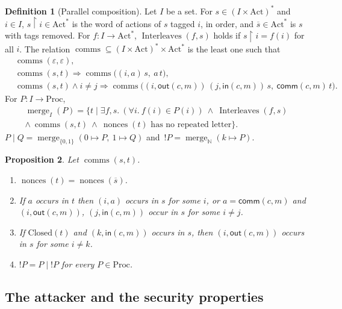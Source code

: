 \documentclass[11pt]{article}
\theoremstyle{definition}
\newtheorem{definition}{Definition}[section]
\theoremstyle{plain}
\newtheorem{proposition}[definition]{Proposition}
\theoremstyle{remark}
\newcommand{\N}{\mathbb{N}}
\newcommand{\Act}{\mathrm{Act}}
\newcommand{\Proc}{\mathrm{Proc}}
\newcommand{\Closed}{\mathrm{Closed}}
\newcommand{\nonces}{\operatorname{nonces}}
\newcommand{\comms}{\operatorname{comms}}
\newcommand{\mrg}{\operatorname{merge}}
\newcommand{\interleaves}{\operatorname{Interleaves}}
\begin{document}
\begin{definition}[Parallel composition]\label{def:par}
Let $I$ be a set. For $s\in(I\times\Act)^*$ and $i\in I$, $s{\restriction}i\in\Act^*$ is the word of actions of $s$ tagged $i$, in order, and $\overline{s}\in\Act^*$ is $s$ with tags removed. For $f:I\to\Act^*$, $\interleaves(f,s)$ holds if $s{\restriction}i=f(i)$ for all $i$. The relation $\comms\subseteq(I\times\Act)^*\times\Act^*$ is the least one such that
\begin{align*}
&\comms(\varepsilon,\varepsilon),\\
&\comms(s,t)\Rightarrow\comms\big((i,a)\,s,\ a\,t\big),\\
&\comms(s,t)\wedge i\ne j\Rightarrow\comms\big((i,\mathsf{out}(c,m))\,(j,\mathsf{in}(c,m))\,s,\ \mathsf{comm}(c,m)\,t\big).
\end{align*}
For $P:I\to\Proc$,
\begin{multline*}
\mrg_I(P)=\{t\mid \exists f,s.\ (\forall i.\ f(i)\in P(i))\ \wedge\ \interleaves(f,s)\\
\wedge\ \comms(s,t)\ \wedge\ \nonces(t)\text{ has no repeated letter}\}.
\end{multline*}
$P\mid Q=\mrg_{\{0,1\}}(0\mapsto P,\ 1\mapsto Q)$ and $\,!P=\mrg_{\N}(k\mapsto P)$.
\end{definition}

\begin{proposition}\label{prop:comms}
Let $\comms(s,t)$.
\begin{enumerate}
\item $\nonces(t)=\nonces(\overline{s})$.
\item If $a$ occurs in $t$ then $(i,a)$ occurs in $s$ for some $i$, or $a=\mathsf{comm}(c,m)$ and $(i,\mathsf{out}(c,m))$, $(j,\mathsf{in}(c,m))$ occur in $s$ for some $i\ne j$.
\item If $\Closed(t)$ and $(k,\mathsf{in}(c,m))$ occurs in $s$, then $(i,\mathsf{out}(c,m))$ occurs in $s$ for some $i\ne k$.
\item $!P=P\mid{!P}$ for every $P\in\Proc$.
\end{enumerate}
\end{proposition}

\subsection{The attacker and the security properties}
\end{document}
